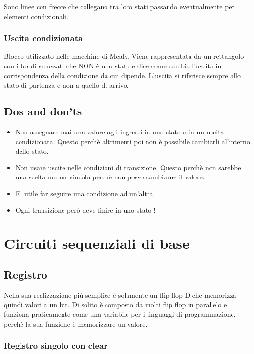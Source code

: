 \documentclass[a4paper]{book}
\begin{document}
Sono linee con frecce che collegano tra loro stati passando eventualmente per elementi condizionali.

\subsection*{Uscita condizionata}

Blocco utilizzato nelle macchine di Mealy.
Viene rappresentata da un rettangolo con i bordi smussati che NON è uno stato e dice come cambia l'uscita in corrispondenza della  condizione da cui dipende.
L'uscita si riferisce sempre allo stato di partenza e non a quello di arrivo.
\section{Dos and don'ts}

\begin{itemize}
\item Non assegnare mai una valore agli ingressi in uno stato o in un uscita condizionata. Questo perchè altrimenti poi non è possibile cambiarli al'interno dello stato.
\item Non usare uscite nelle condizioni di transizione. Questo perchè non sarebbe una scelta ma un vincolo perchè non posso cambiarne il valore.
\item E' utile far seguire una condizione ad un'altra.
\item Ogni transizione però deve finire in uno stato !
\end{itemize}


\chapter{Circuiti sequenziali di base}

\section{Registro}

Nella sua realizzazione più semplice è solamente un flip flop D che memorizza quindi valori a un bit.
Di solito è composto da molti flip flop in parallelo e funziona praticamente come una variabile per i linguaggi di programmazione, perchè la sua funzione è memorizzare un valore.

\subsection{Registro singolo con clear}
\end{document}
